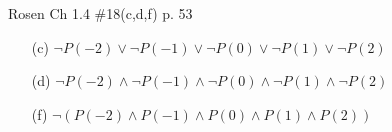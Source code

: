 \documentclass[12pt,addpoints]{exam}
\begin{document}
\begin{questions}
\question Rosen Ch 1.4 \#18(c,d,f) p. 53
    \begin{solution}
    \begin{itemize}
        \item[(c)] $\neg P(-2) \vee \neg P(-1) \vee \neg P(0) \vee \neg P(1) \vee \neg P(2)$
        \item[(d)] $\neg P(-2) \wedge \neg P(-1) \wedge \neg P(0) \wedge \neg P(1) \wedge \neg P(2)$
        \item[(f)] $\neg (P(-2) \wedge P(-1) \wedge P(0) \wedge P(1) \wedge P(2))$
    \end{itemize}
    \end{solution}


\end{questions}
\end{document}

